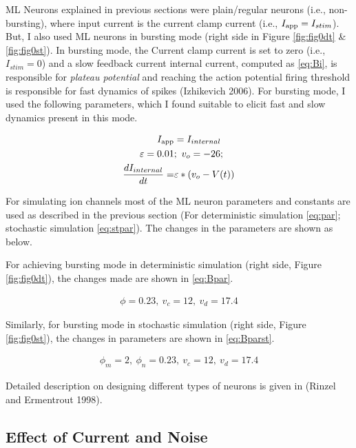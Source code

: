 \documentclass[
]{article}
\begin{document}
ML Neurons explained in previous sections were plain/regular neurons (i.e., non-bursting), where input current is the current clamp current (i.e., \(I_{\rm app} = I_{stim}\)). But, I also used ML neurons in bursting mode (right side in Figure \ref{fig:fig0dt} \& \ref{fig:fig0st}). In bursting mode, the Current clamp current is set to zero (i.e., \(I_{stim}=0\)) and a slow feedback current internal current, computed as \eqref{eq:Bi}, is responsible for \emph{plateau potential} and reaching the action potential firing threshold is responsible for fast dynamics of spikes (Izhikevich 2006). For bursting mode, I used the following parameters, which I found suitable to elicit fast and slow dynamics present in this mode.

\begin{align} 
\nonumber I_{\rm app} &= I_{internal}
\\ \nonumber \varepsilon = 0.01&;\ v_o = -26;
\\ \label{eq:Bi} \frac{dI_{internal}}{dt} = &\varepsilon*(v_o - V(t))
\end{align}

For simulating ion channels most of the ML neuron parameters and constants are used as described in the previous section (For deterministic simulation \eqref{eq:par}; stochastic simulation \eqref{eq:stpar}). The changes in the parameters are shown as below.

For achieving bursting mode in deterministic simulation (right side, Figure \ref{fig:fig0dt}), the changes made are shown in \eqref{eq:Bpar}.

\begin{equation} \label{eq:Bpar}
\begin{split}
\phi=0.23,\ v_c = 12,\ v_d = 17.4
\end{split}
\end{equation}

Similarly, for bursting mode in stochastic simulation (right side, Figure \ref{fig:fig0st}), the changes in parameters are shown in \eqref{eq:Bparst}.

\begin{equation} \label{eq:Bparst}
\begin{split}
\phi_m=2,\ \phi_n=0.23,\ v_c = 12,\ v_d = 17.4
\end{split}
\end{equation}

Detailed description on designing different types of neurons is given in (Rinzel and Ermentrout 1998).

\hypertarget{effect-of-current-and-noise}{%
\subsection{Effect of Current and Noise}\label{effect-of-current-and-noise}}
\end{document}
